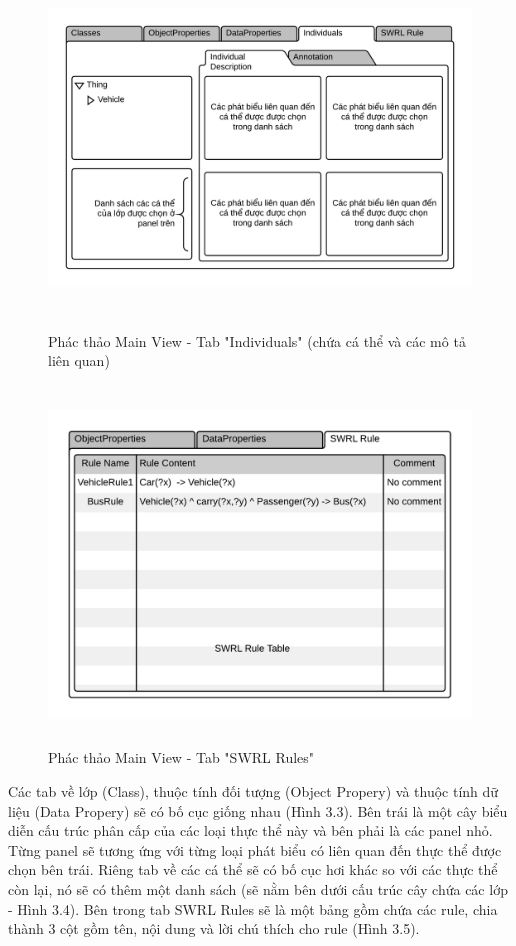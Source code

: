 \begin{figure}[h!]
	\centering
	\includegraphics[width=150mm,height=95mm]{Figures/ui_mainview_individual.png}
	\caption{Phác thảo Main View - Tab "Individuals" (chứa cá thể và các mô tả liên quan) \label{overflow}}
\end{figure}
\begin{figure}[h!]
	\centering
	\includegraphics[width=150mm,height=95mm]{Figures/ui_mainview_swrltab.png}
	\caption{Phác thảo Main View - Tab "SWRL Rules" \label{overflow}}
\end{figure}
Các tab về lớp (Class), thuộc tính đối tượng (Object Propery) và thuộc tính dữ liệu (Data Propery) sẽ có bố cục giống nhau (Hình 3.3). Bên trái là một cây biểu diễn cấu trúc phân cấp của các loại thực thể này và bên phải là các panel nhỏ. Từng panel sẽ tương ứng với từng loại phát biểu có liên quan đến thực thể được chọn bên trái. Riêng tab về các cá thể sẽ có bố cục hơi khác so với các thực thể còn lại, nó sẽ có thêm một danh sách (sẽ nằm bên dưới cấu trúc cây chứa các lớp - Hình 3.4). Bên trong tab SWRL Rules sẽ là một bảng gồm chứa các rule, chia thành 3 cột gồm tên, nội dung và lời chú thích cho rule (Hình 3.5).
